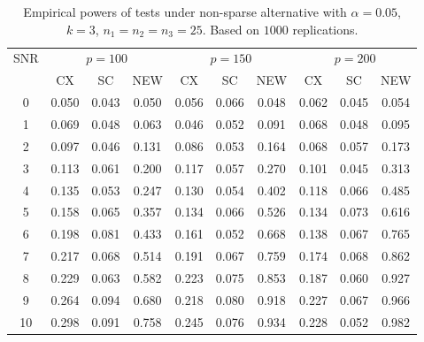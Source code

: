 \documentclass[review]{elsarticle}
\theoremstyle{plain}
\theoremstyle{definition}
\theoremstyle{remark}
\begin{document}
\begin{table}[!hbp]
    \caption{Empirical powers of tests under non-sparse alternative with $\alpha=0.05$, $k=3$, $n_1=n_2=n_3=25$. Based on $1000$ replications.}
\centering
\begin{tabular}{*{10}{c}}
\toprule
\multirow{2}{*}{SNR} &\multicolumn{3}{c}{$p=100$}&\multicolumn{3}{c}{$p=150$}&\multicolumn{3}{c}{$p=200$} \\
    \cmidrule(r){2-4}\cmidrule(r){5-7}\cmidrule(r){8-10}
        & CX & SC & NEW & CX &SC &NEW &CX & SC & NEW\\
\midrule
0 & 0.050 & 0.043 & 0.050 & 0.056 & 0.066 & 0.048 & 0.062 & 0.045 & 0.054 \\ 
1 & 0.069 & 0.048 & 0.063 & 0.046 & 0.052 & 0.091 & 0.068 & 0.048 & 0.095 \\ 
2 & 0.097 & 0.046 & 0.131 & 0.086 & 0.053 & 0.164 & 0.068 & 0.057 & 0.173 \\ 
3 & 0.113 & 0.061 & 0.200 & 0.117 & 0.057 & 0.270 & 0.101 & 0.045 & 0.313 \\ 
4 & 0.135 & 0.053 & 0.247 & 0.130 & 0.054 & 0.402 & 0.118 & 0.066 & 0.485 \\ 
5 & 0.158 & 0.065 & 0.357 & 0.134 & 0.066 & 0.526 & 0.134 & 0.073 & 0.616 \\ 
6 & 0.198 & 0.081 & 0.433 & 0.161 & 0.052 & 0.668 & 0.138 & 0.067 & 0.765 \\ 
7 & 0.217 & 0.068 & 0.514 & 0.191 & 0.067 & 0.759 & 0.174 & 0.068 & 0.862 \\ 
8 & 0.229 & 0.063 & 0.582 & 0.223 & 0.075 & 0.853 & 0.187 & 0.060 & 0.927 \\ 
9 & 0.264 & 0.094 & 0.680 & 0.218 & 0.080 & 0.918 & 0.227 & 0.067 & 0.966 \\ 
10 & 0.298 & 0.091 & 0.758 & 0.245 & 0.076 & 0.934 & 0.228 & 0.052 & 0.982 \\ 
\bottomrule
\end{tabular}
\end{table}
\end{document}
